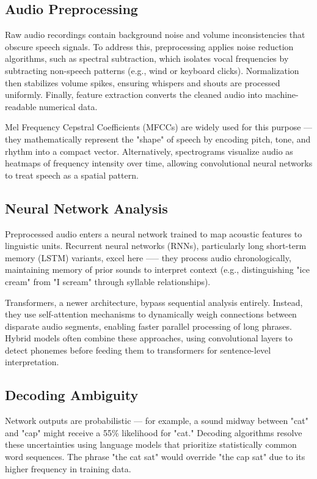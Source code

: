 \subsection{Audio Preprocessing}
Raw audio recordings contain background noise and volume inconsistencies that obscure speech signals.
To address this, preprocessing applies noise reduction algorithms, such as spectral subtraction,
which isolates vocal frequencies by subtracting non-speech patterns (e.g., wind or keyboard clicks).
Normalization then stabilizes volume spikes, ensuring whispers and shouts are processed uniformly.
Finally, feature extraction converts the cleaned audio into machine-readable numerical data.

Mel Frequency Cepstral Coefficients (MFCCs) are widely used for this purpose ---  they mathematically represent
the "shape" of speech by encoding pitch, tone, and rhythm into a compact vector.
Alternatively, spectrograms visualize audio as heatmaps of frequency intensity over time,
allowing convolutional neural networks to treat speech as a spatial pattern.

\subsection{Neural Network Analysis}
Preprocessed audio enters a neural network trained to map acoustic features to linguistic units.
Recurrent neural networks (RNNs), particularly long short-term memory (LSTM) variants, excel here
—--
they process audio chronologically, maintaining memory of prior sounds to interpret context
(e.g., distinguishing "ice cream" from "I scream" through syllable relationships).

Transformers, a newer architecture, bypass sequential analysis entirely.
Instead, they use self-attention mechanisms to dynamically weigh connections between
disparate audio segments, enabling faster parallel processing of long phrases.
Hybrid models often combine these approaches, using convolutional layers to detect phonemes
before feeding them to transformers for sentence-level interpretation.

\subsection{Decoding Ambiguity}
Network outputs are probabilistic --- for example, a sound midway between "cat" and "cap" might receive
a 55\% likelihood for "cat." Decoding algorithms resolve these uncertainties using language models
that prioritize statistically common word sequences. The phrase "the cat sat" would override
"the cap sat" due to its higher frequency in training data.


